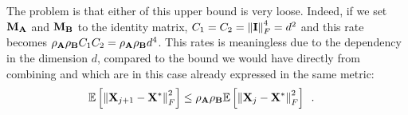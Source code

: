 \documentclass[10pt]{article}
\makeatletter
\renewcommand*{\eqref}[1]{%
  \hyperref[{#1}]{\textup{\tagform@{\ref*{#1}}}}%
}
\theoremstyle{definition}
\makeatother
\begin{document}
The problem is that either of this upper bound is very loose. Indeed, if we set ${\bf M}_{{\bf A}}$ and ${\bf M}_{{\bf B}}$ to the identity matrix, $C_1 = C_2 = \left\| {\bf I} \right\|_{F}^4 = d^2$ and this rate becomes $\rho_{{\bf A}} \rho_{{\bf B}} C_1 C_2 = \rho_{{\bf A}} \rho_{{\bf B}} d^4$. This rates is meaningless due to the dependency in the dimension $d$, compared to the bound we would have directly from combining \eqref{eq:cv_rho_A} and \eqref{eq:cv_rho_B} which are in this case already expressed in the same metric:
\begin{align}
    \mathbb{E}\left[\left\| {\bf X}_{j+1}-{\bf X}^* \right\|_{F}^2\right] &\leq \rho_{{\bf A}} \rho_{{\bf B}} \mathbb{E}\left[\left\| {\bf X}_{j}-{\bf X}^* \right\|_{F}^2\right] \enspace.
\end{align}

{\printbibliography}
\end{document}

